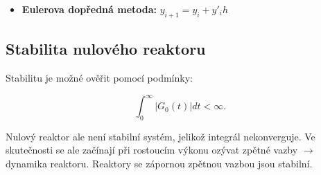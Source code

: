\begin{itemize}
  \item \textbf{Eulerova dopředná metoda:} $y_{i+1} = y_i + y'_i h$
\end{itemize}

\subsection{Stabilita nulového reaktoru}

Stabilitu je možné ověřit pomocí podmínky:

$$ \int_0^\infty  |G_0(t)| dt < \infty. $$

Nulový reaktor ale není stabilní systém, jelikož integrál nekonverguje. Ve skutečnosti se ale začínají při rostoucím výkonu ozývat zpětné vazby $\rightarrow$ dynamika reaktoru. Reaktory se zápornou zpětnou vazbou jsou stabilní.
